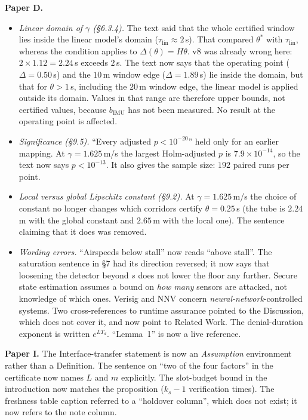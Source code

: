 \documentclass[11pt,a4paper]{article}
\begin{document}
\textbf{Paper D.}
\begin{itemize}[leftmargin=1.4em,itemsep=2pt]
\item \emph{Linear domain of $\gamma$ (\S6.3.4).} The text said that the whole
certified window lies inside the linear model's domain ($\tau_{\mathrm{lin}}\approx2$\,s).
That compared $\theta^*$ with $\tau_{\mathrm{lin}}$, whereas the condition applies to
$\Delta(\theta)=H\theta$. v8 was already wrong here: $2\times1.12=2.24$\,s exceeds
$2$\,s. The text now says that the operating point ($\Delta=0.50$\,s) and the
$10$\,m window edge ($\Delta=1.89$\,s) lie inside the domain, but that for
$\theta>1$\,s, including the $20$\,m window edge, the linear model is applied
outside its domain. Values in that range are therefore upper bounds, not certified
values, because $b_{\mathrm{IMU}}$ has not been measured. No result at the
operating point is affected.
\item \emph{Significance (\S9.5).} ``Every adjusted $p<10^{-20}$'' held only for an
earlier mapping. At $\gamma=1.625$\,m/s the largest Holm-adjusted $p$ is
$7.9\times10^{-14}$, so the text now says $p<10^{-13}$. It also gives the sample
size: $192$ paired runs per point.
\item \emph{Local versus global Lipschitz constant (\S9.2).} At $\gamma=1.625$\,m/s
the choice of constant no longer changes which corridors certify $\theta=0.25$\,s
(the tube is $2.24$\,m with the global constant and $2.65$\,m with the local one).
The sentence claiming that it does was removed.
\item \emph{Wording errors.} ``Airspeeds below stall'' now reads ``above stall''.
The saturation sentence in \S7 had its direction reversed; it now says that
loosening the detector beyond $s$ does not lower the floor any further. Secure
state estimation assumes a bound on \emph{how many} sensors are attacked, not
knowledge of which ones. Verisig and NNV concern \emph{neural-network}-controlled
systems. Two cross-references to runtime assurance pointed to the Discussion,
which does not cover it, and now point to Related Work. The denial-duration
exponent is written $e^{LT_d}$. ``Lemma~1'' is now a live reference.
\end{itemize}

\textbf{Paper I.} The Interface-transfer statement is now an \emph{Assumption}
environment rather than a Definition. The sentence on ``two of the four factors''
in the certificate now names $L$ and $m$ explicitly. The slot-budget bound in the
introduction now matches the proposition ($k_s-1$ verification times). The
freshness table caption referred to a ``holdover column'', which does not exist;
it now refers to the note column.
\end{document}
